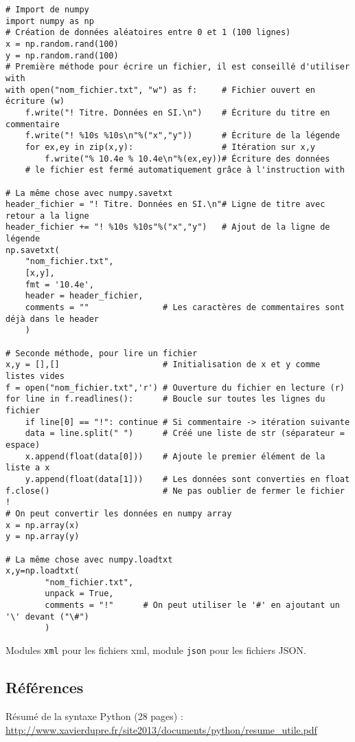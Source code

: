 \documentclass{article}
\begin{document}
\begin{verbatim}
# Import de numpy
import numpy as np
# Création de données aléatoires entre 0 et 1 (100 lignes)
x = np.random.rand(100)
y = np.random.rand(100)
# Première méthode pour écrire un fichier, il est conseillé d'utiliser with
with open("nom_fichier.txt", "w") as f:     # Fichier ouvert en écriture (w)
    f.write("! Titre. Données en SI.\n")    # Écriture du titre en commentaire
    f.write("! %10s %10s\n"%("x","y"))      # Écriture de la légende
    for ex,ey in zip(x,y):                  # Itération sur x,y
        f.write("% 10.4e % 10.4e\n"%(ex,ey))# Écriture des données
    # le fichier est fermé automatiquement grâce à l'instruction with

# La même chose avec numpy.savetxt
header_fichier = "! Titre. Données en SI.\n"# Ligne de titre avec retour a la ligne
header_fichier += "! %10s %10s"%("x","y")   # Ajout de la ligne de légende
np.savetxt(
    "nom_fichier.txt",
    [x,y],
    fmt = '10.4e',
    header = header_fichier,
    comments = ""               # Les caractères de commentaires sont déjà dans le header
    )

# Seconde méthode, pour lire un fichier
x,y = [],[]                     # Initialisation de x et y comme listes vides
f = open("nom_fichier.txt",'r') # Ouverture du fichier en lecture (r)
for line in f.readlines():      # Boucle sur toutes les lignes du fichier
    if line[0] == "!": continue # Si commentaire -> itération suivante
    data = line.split(" ")      # Créé une liste de str (séparateur = espace)
    x.append(float(data[0]))    # Ajoute le premier élément de la liste a x
    y.append(float(data[1]))    # Les données sont converties en float
f.close()                       # Ne pas oublier de fermer le fichier !
# On peut convertir les données en numpy array
x = np.array(x)
y = np.array(y)

# La même chose avec numpy.loadtxt
x,y=np.loadtxt(
        "nom_fichier.txt",
        unpack = True,
        comments = "!"      # On peut utiliser le '#' en ajoutant un '\' devant ("\#")
        )
\end{verbatim}
Modules \texttt{xml} pour les fichiers xml, module \texttt{json} pour les fichiers JSON.

\subsection*{Références}

Résumé de la syntaxe Python (28 pages) :\\ \url{http://www.xavierdupre.fr/site2013/documents/python/resume_utile.pdf}
\end{document}
